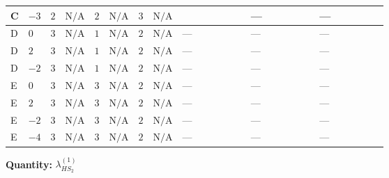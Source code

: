 \documentclass[8pt]{article}
\begin{document}
\begin{landscape}
\begin{longtable}{@{}llcccccc >{\raggedright\arraybackslash}p{0.21\linewidth} >{\raggedright\arraybackslash}p{0.21\linewidth} >{\raggedright\arraybackslash}p{0.21\linewidth}@{}}
\midrule
C & $-3$ & $2$ & $\text{N/A}$ & $2$ & $\text{N/A}$ & $3$ & $\text{N/A}$ & \scriptsize\adjustbox{max width=\linewidth}{$\begin{gathered} +\frac{3 {\lambda_{HS_2}^{(A)}}^2}{4}\end{gathered}$} & --- & --- \\
\midrule
D & $0$ & $3$ & $\text{N/A}$ & $1$ & $\text{N/A}$ & $2$ & $\text{N/A}$ & --- & --- & --- \\
\midrule
D & $2$ & $3$ & $\text{N/A}$ & $1$ & $\text{N/A}$ & $2$ & $\text{N/A}$ & --- & --- & --- \\
\midrule
D & $-2$ & $3$ & $\text{N/A}$ & $1$ & $\text{N/A}$ & $2$ & $\text{N/A}$ & --- & --- & --- \\
\midrule
E & $0$ & $3$ & $\text{N/A}$ & $3$ & $\text{N/A}$ & $2$ & $\text{N/A}$ & --- & --- & --- \\
\midrule
E & $2$ & $3$ & $\text{N/A}$ & $3$ & $\text{N/A}$ & $2$ & $\text{N/A}$ & --- & --- & --- \\
\midrule
E & $-2$ & $3$ & $\text{N/A}$ & $3$ & $\text{N/A}$ & $2$ & $\text{N/A}$ & --- & --- & --- \\
\midrule
E & $-4$ & $3$ & $\text{N/A}$ & $3$ & $\text{N/A}$ & $2$ & $\text{N/A}$ & --- & --- & --- \\
\midrule
\bottomrule
\end{longtable}
\clearpage
\noindent\textbf{Quantity: }$\lambda_{HS_2}^{(1)}$\par\smallskip

\end{landscape}
\end{document}
